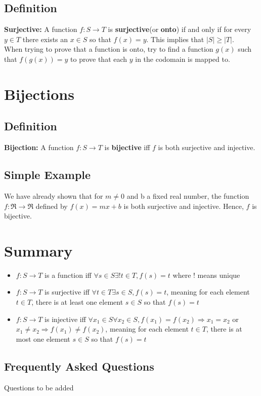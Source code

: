 \documentclass[12pt]{report}
\begin{document}
		\subsection{Definition}
			\textbf{Surjective:} A function $f:S \rightarrow T$ is \textbf{surjective}(or \textbf{onto}) if and only if for every $y \in T$ there exists an $x \in S $ so that $f(x) = y$. This implies that $|S| \geq |T|$. \\
			When trying to prove that a function is onto, try to find a function $g(x)$ such that $f(g(x)) = y$ to prove that each $y$ in the codomain is mapped to.
	\section{Bijections}
		\subsection{Definition}
			\textbf{Bijection:} A function $f:S \rightarrow T$ is \textbf{bijective} iff $f$ is both surjective and injective.
		\subsection{Simple Example}
			We have already shown that for $m \neq 0$ and b a fixed real number, the function $f:\Re \rightarrow \Re$ defined by $f(x) = mx + b$ is both surjective and injective. Hence, $f$ is bijective.

	\section{Summary}
		\begin{itemize}
			\item $f:S \rightarrow T$ is a function iff $\forall s \in S \exists !t \in T, f(s) = t$ where ! means unique
			\item $f:S \rightarrow T$ is surjective iff $\forall t \in T \exists s \in S, f(s) = t$, meaning for each element $t \in T$, there is at least one element $s \in S$ so that $f(s) = t$			

			\item $f:S \rightarrow T$ is injective iff $\forall x_1 \in S \forall x_2 \in S, f(x_1) = f(x_2) \Rightarrow x_1 = x_2$ or $x_1 \neq x_2 \Rightarrow f(x_1) \neq f(x_2)$, meaning for each element $t \in T$, there is at most one element $s \in S$ so that $f(s) = t$			
		\end{itemize}
		\subsection{Frequently Asked Questions}
			Questions to be added
\end{document}
